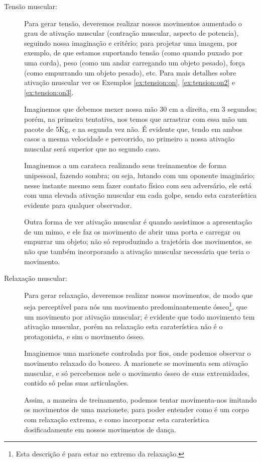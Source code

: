 \begin{description}
\item[Tensão muscular:] Para gerar tensão, 
deveremos realizar nossos movimentos aumentado o grau de ativação muscular (contração muscular, aspecto de potencia), 
seguindo nossa imaginação e  critério;
para projetar uma imagem, por exemplo, de que estamos suportando tensão (como quando puxado por uma corda), 
peso (como um andar carregando um objeto pesado), força (como empurrando um objeto pesado), etc.
Para mais detalhes sobre ativação muscular ver os  Exemplos \ref{ex:tension:on}, \ref{ex:tension:on2} e \ref{ex:tension:on3}.
\begin{example}
\label{ex:tension:on}
Imaginemos que debemos mexer nossa mão 30 cm a direita, em 3 segundos;
porém, na primeira tentativa, nos temos que arrastrar com essa mão um pacote de 5Kg,
e na segunda vez não.
É evidente que, tendo em ambos casos a mesma velocidade e percorrido,
no primeiro a nossa ativação muscular será superior que no segundo caso.
\end{example}
\begin{example}
\label{ex:tension:on2}
Imaginemos a um carateca realizando seus treinamentos de forma unipessoal, 
fazendo sombra; ou seja, lutando com um oponente imaginário;
nesse instante mesmo sem fazer contato físico com seu adversário,
ele está com uma elevada ativação muscular em cada golpe,
sendo esta caraterística evidente para qualquer  observador.
\end{example}
\begin{example}
\label{ex:tension:on3}
Outra forma de ver ativação muscular é quando assistimos a apresentação de um mimo,
e ele faz os movimento de  abrir uma porta e carregar ou empurrar um objeto;
não só reproduzindo a trajetória dos movimentos, 
se não que também incorporando a ativação muscular necessária que teria o movimento. 
\end{example}
\item[Relaxação muscular:] Para gerar relaxação, 
deveremos realizar nossos movimentos, 
de modo que seja  perceptível para nós um movimento predominantemente ósseo\footnote{Esta
descrição é para estar no extremo da relaxação.}, 
que um movimento por ativação muscular;
é evidente que todo movimento tem ativação muscular,
porém na relaxação esta caraterística não é o protagonista,
e sim o movimento ósseo.
\begin{example}
Imaginemos uma marionete controlada por fios, 
onde podemos observar o movimento relaxado do boneco.
A marionete se movimenta sem ativação muscular, 
e só percebemos nele o movimento ósseo de suas extremidades, 
contido só pelas suas articulações.

Assim, a maneira de treinamento, 
podemos tentar movimenta-nos imitando os movimentos de uma marionete,
para poder entender como é um corpo com relaxação extrema,
e como incorporar esta caraterística dosificadamente em nossos movimentos de dança.
\end{example} 
\end{description}

